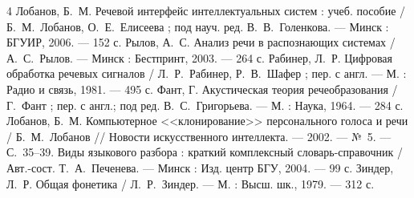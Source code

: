 \begin{thebibliography}{4}
		Лобанов, Б.~М. Речевой интерфейс интеллектуальных систем :
		учеб. пособие / Б.~М.~Лобанов, О.~Е.~Елисеева ; под науч. ред.
		В.~В.~Голенкова. --- Минск : БГУИР, 2006. --- 152 с.
		Рылов, А.~С. Анализ речи в распознающих системах /
		А.~С.~Рылов. --- Минск : Бестпринт, 2003. --- 264 с.
		Рабинер, Л.~Р. Цифровая обработка речевых сигналов /
		Л.~Р.~Рабинер, Р.~В.~Шафер ; пер. с англ. --- М. : Радио и
		связь, 1981. --- 495 с.
		Фант, Г. Акустическая теория речеобразования / Г.~Фант ; пер. с
		англ.; под ред. В.~С.~Григорьева. --- М. : Наука, 1964. --- 284 с.
		Лобанов, Б.~М. Компьютерное <<клонирование>> персонального голоса
		и речи / Б.~М.~Лобанов // Новости искусственного интеллекта. ---
		2002. --- №~5. --- С.~35--39.
		Виды языкового разбора : краткий комплексный
		словарь-справочник / Авт.-сост. Т.~А.~Печенева. --- Минск :
		Изд. центр БГУ, 2004. --- 99 с.
		Зиндер, Л.~Р. Общая фонетика / Л.~Р.~Зиндер. --- М. : Высш.
		шк., 1979. --- 312 с.
\end{thebibliography}
